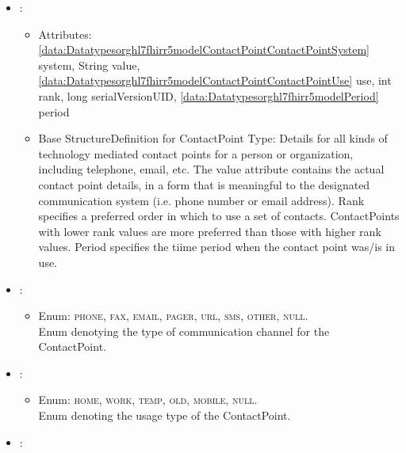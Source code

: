 \begin{itemize}[nolistsep,noitemsep]
\item {}: 
\begin{itemize}[noitemsep,nolistsep]
\item[] Attributes: \ref{data:Datatypesorghl7fhirr5modelContactPointContactPointSystem} system, String value, \ref{data:Datatypesorghl7fhirr5modelContactPointContactPointUse} use, int rank, long serialVersionUID, \ref{data:Datatypesorghl7fhirr5modelPeriod} period
\item[] Base StructureDefinition for ContactPoint Type: Details for all kinds of technology mediated contact points for a person or organization, including telephone, email, etc.
The value attribute contains the actual contact point details, in a form that is meaningful to the designated communication system (i.e. phone number or email address).
Rank specifies a preferred order in which to use a set of contacts. ContactPoints with lower rank values are more preferred than those with higher rank values.
Period specifies the tiime period when the contact point was/is in use.

\end{itemize}

\item {}: 
\begin{itemize}[noitemsep,nolistsep]

\item[] Enum: \textsc{phone}, \textsc{fax}, \textsc{email}, \textsc{pager}, \textsc{url}, \textsc{sms}, \textsc{other}, \textsc{null}.\\Enum denotying the type of communication channel for the ContactPoint.
\end{itemize}

\item {}: 
\begin{itemize}[noitemsep,nolistsep]

\item[] Enum: \textsc{home}, \textsc{work}, \textsc{temp}, \textsc{old}, \textsc{mobile}, \textsc{null}.\\Enum denoting the usage type of the ContactPoint.
\end{itemize}

\item {}: 
\begin{itemize}


\end{itemize}
\end{itemize}
